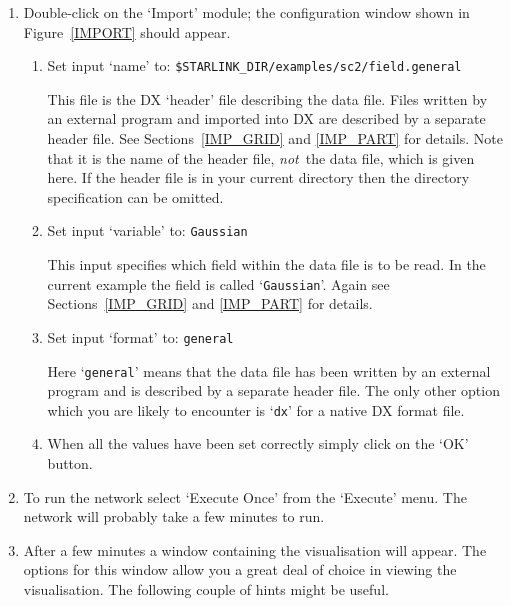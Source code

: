 \documentclass[twoside,11pt]{starlink}
\begin{document}
\begin{enumerate}

  \item Double-click on the `Import' module; the configuration window
   shown in Figure~\ref{IMPORT} should appear.

  \begin{enumerate}

    \item Set input `name' to: \texttt{\$STARLINK\_DIR/examples/sc2/field.general}

     This file is the DX `header' file describing the data file.
     Files written by an external program and imported into DX are
     described by a separate header file. See Sections~\ref{IMP_GRID}
     and \ref{IMP_PART} for details. Note that it is the name of the
     header file, \textit{not}\, the data file, which is given here. If
     the header file is in your current directory then the directory
     specification can be omitted.

    \item Set input `variable' to: \texttt{Gaussian}

     This input specifies which field within the data file is to be
     read. In the current example the field is called `\texttt{Gaussian}'.
     Again see Sections~\ref{IMP_GRID} and \ref{IMP_PART} for details.

    \item Set input `format' to: \texttt{general}

     Here `\texttt{general}' means that the data file has been written by
     an external program and is described by a separate header file.
     The only other option which you are likely to encounter is `\texttt{dx}' for a native DX format file.

    \item When all the values have been set correctly simply click on
     the `OK' button.

  \end{enumerate}

  \item To run the network select `Execute Once' from the `Execute'
   menu.  The network will probably take a few minutes to run.

  \item After a few minutes a window containing the visualisation will
   appear. The options for this window allow you a great deal of choice
   in viewing the visualisation. The following couple of hints might be
   useful.


\end{enumerate}
\end{document}
